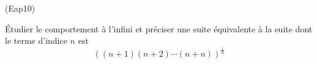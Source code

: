 \begin{tiny}(Eap10)\end{tiny} \'Etudier le comportement à l'infini et préciser une suite équivalente à la suite dont le terme d'indice $n$ est
\begin{displaymath}
 \left( (n+1)(n+2)\cdots(n+n)\right)^{\frac{1}{n}}
\end{displaymath}
